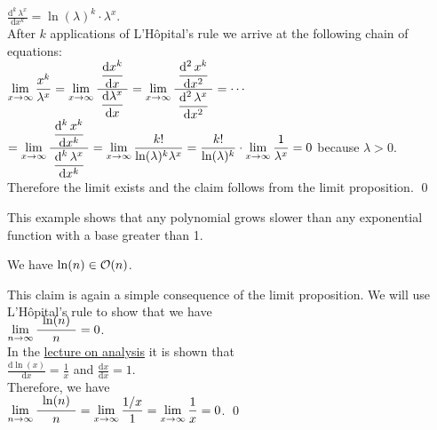  $\displaystyle \frac{\mathrm{d}^k\,\lambda^{x}}{\mathrm{d}x^k} = \ln(\lambda)^k \cdot \lambda^x$. \\[0.2cm]
After $k$ applications of L'H\^opital's rule we arrive at the following chain of equations:
\\[0.2cm]
\hspace*{1.3cm} 
$\displaystyle 
\lim\limits_{x \rightarrow \infty} \frac{x^{k}}{\lambda^x} =
\lim\limits_{x \rightarrow \infty} \frac{\displaystyle\;\frac{\mathrm{d}x^{k}}{\mathrm{d}x}\;}{\displaystyle\frac{\mathrm{d}\lambda^x}{\mathrm{d}x}} =
\lim\limits_{x \rightarrow \infty} \frac{\displaystyle\;\frac{\mathrm{d}^2\,x^{k}}{\mathrm{d}x^2}\;}{\displaystyle\frac{\mathrm{d}^2\,\lambda^x}{\mathrm{d}x^2}} =
\cdots$
\\[0.3cm]
\hspace*{2.8cm}
$\displaystyle = 
\lim\limits_{x \rightarrow \infty} \frac{\displaystyle\;\frac{\mathrm{d}^k\,x^{k}}{\mathrm{d}x^k}\;}{\displaystyle\frac{\mathrm{d}^k\,\lambda^x}{\mathrm{d}x^k}} =
\lim\limits_{x \rightarrow \infty} \frac{k!}{\ln(\lambda)^k \lambda^x} =
\frac{k!}{\ln(\lambda)^k} \cdot \lim\limits_{x \rightarrow \infty} \frac{1}{\lambda^x} = 0$ \quad because
$\lambda > 0$.
\\[0.2cm] 
Therefore the limit exists and the claim follows from the limit proposition.
\qed
\pagebreak

\remark
This example shows that any polynomial grows slower than any exponential function with a base greater than 1.
\eoxs

\example
We have $\ln(n) \in \mathcal{O}(n)$.
\ex

\proof
This claim is again a simple consequence of the limit proposition.  We will use L'H\^opital's rule
to show that we have
\\[0.4cm]
\hspace*{1.3cm} 
$\lim\limits_{n \rightarrow \infty} \bruch{\;\ln(n)\;}{n} = 0$.
\\[0.2cm]
In the \href{https://github.com/karlstroetmann/Analysis/blob/master/Skript/analysis.pdf}{lecture on analysis}
it is shown that \\[0.2cm] 
\hspace*{1.3cm} $\displaystyle \frac{\mathrm{d} \ln(x)}{\mathrm{d}x} = \frac{1}{x}$ 
\quad and \quad
 $\displaystyle \frac{\mathrm{d} x}{\mathrm{d}x} = 1$. \\[0.2cm]
Therefore, we have \\[0.2cm]
\hspace*{1.3cm} 
$\displaystyle \lim\limits_{n \rightarrow \infty} \bruch{\;\ln(n)\;}{n} = 
\lim\limits_{x \rightarrow \infty} \frac{1/x}{1} = 
\lim\limits_{x \rightarrow \infty} \frac{1}{x} = 0$. \qed


